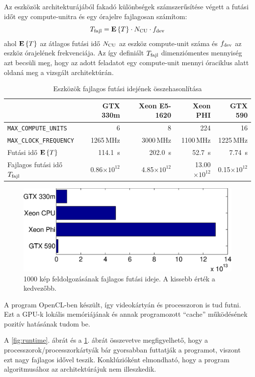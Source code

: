 	Az eszközök architekturájából fakadó különbségek számszerűsítése végett a futási időt egy compute-unitra és egy
	órajelre fajlagosan számítom:
	\begin{equation}
	T_{\rm fajl} = {\mathop{\bf E\/}\left\{T\right\}} \cdot N_{\rm CU} \cdot f_{\rm dev}
	\end{equation}
	ahol ${\mathop{\bf E\/}\left\{T\right\}}$ az átlagos futási idő $N_{\rm CU}$ az eszköz compute-unit
        száma és $f_{\rm dev}$ az eszköz órajelének frekvenciája. Az
        így definiált $T_{\rm fajl}$ dimenziómentes mennyiség azt
        becsüli meg, hogy az adott feladatot egy compute-unit mennyi
        óraciklus alatt oldaná meg a vizsgált architektúrán.
        
	\begin{table}[H]
	\footnotesize
	\centering
	
	\setlength{\extrarowheight}{3.5pt}
	\begin{tabular}{ l | r | r | r | r}
		 & GTX 330m & Xeon E5-1620 & Xeon PHI & GTX 590\\ \hline
		\texttt{MAX\_COMPUTE\_UNITS} & 6 & 8 & 224 & 16\\
		\texttt{MAX\_CLOCK\_FREQUENCY} & 1265\,MHz & 3000\,MHz & 1100\,MHz & 1225\,MHz\\\hline\hline
		Futási idő ${\mathop{\bf E\/}\left\{T\right\}}$ & 114.1~s & 202.0~s & 52.7~s & 7.74~s\\
		Fajlagos futási idő $T_{\rm fajl}$ & 0.86$\times 10^{12}$ & 4.85$\times 10^{12}$ & 13.00$\times 10^{12}$ & 0.15$\times 10^{12}$
	\end{tabular}
	
	\caption{Eszközök fajlagos futási idejének összehasonlítása}
	\label{table:results_f}
	\end{table}	
	
	\begin{figure}[!h]
	\begin{center}
	  \includegraphics[width=0.9\columnwidth]{figures/eps/runtime_f.eps}
	  \caption[1000 kép feldolgozásának fajlagos futási ideje.]{1000 kép feldolgozásának fajlagos futási ideje. A kissebb érték a
	  kedvezőbb.}
	  \label{fig:runtime_f}
	\end{center}
	\end{figure}
	
	A program OpenCL-ben készült, így videokártyán és processzoron is tud futni.
	Ezt a GPU-k lokális memóriájának és annak programozott ``cache'' működésének pozitív hatásának tudom be.
	
	A \ref{fig:runtime}. ábrát és a \ref{fig:runtime_f}. ábrát összevetve megfigyelhető, hogy a processzorok/processzorkártyák bár
	gyorsabban futtatják a programot, viszont ezt nagy fajlagos idővel teszik. Konklúzióként elmondható, hogy a program
	algoritmusához az architektúrájuk nem illeszkedik.
	
